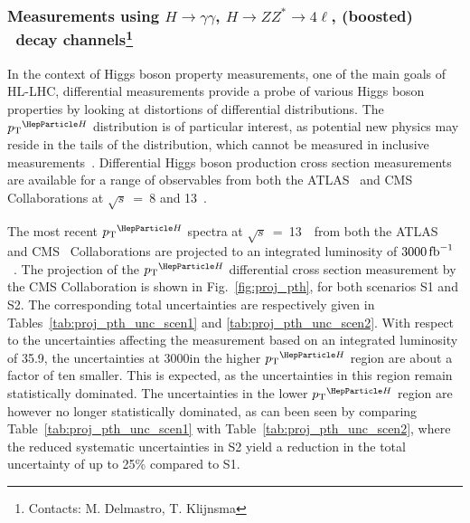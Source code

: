 \subsubsection[Measurements using $H \to \gamma\gamma$, $H \to ZZ^* \to 4\ell$, (boosted) \Hbb\ decay channels]{Measurements using $H \to \gamma\gamma$, $H \to ZZ^* \to 4\ell$, (boosted) \Hbb\ decay channels\footnote{Contacts: M. Delmastro, T. Klijnsma}}
\label{sec:diffxs}


\noindent In the context of Higgs boson property measurements, one of the main goals of HL-LHC, differential measurements provide a probe of various Higgs boson properties by looking at distortions of differential distributions.
% 
The $\pTH$ distribution is of particular interest, as potential new physics may reside in the tails of the distribution, which cannot be measured in inclusive measurements~\cite{%
Khachatryan:2016vau,%
Aad:2015zhl,%
CMS:2018lkl%
}.
% 
Differential Higgs boson production cross section measurements are available for a range of observables from both the ATLAS~\cite{%
Aad:2014lwa,%
Aad:2014tca,%
Aad:2016lvc,%
Aaboud:2018xdt,%
Aaboud:2017oem,%
Aaboud:2018ezd%
} and CMS~\cite{%
Khachatryan:2015rxa,%
Khachatryan:2015yvw,%
Khachatryan:2016vnn,%
Sirunyan:2018kta,%
Sirunyan:2017exp,
Sirunyan:2018sgc
} Collaborations at $\sqrt{s}$~=~8 and 13~\UTeV.

The most recent $\pTH$ spectra at $\sqrt{s}$~=~13~\UTeV\ from both the ATLAS~\cite{Aaboud:2018ezd} and CMS~\cite{Sirunyan:2018sgc} Collaborations are projected to an integrated luminosity of $3000\mbox{\ensuremath{\,\text{fb}^\text{$-$1}}}$~\cite{CMS-PAS-FTR-18-011, ATL-PHYS-PUB-2018-040}.
The projection of the $\pTH$ differential cross section measurement by the CMS Collaboration is shown in Fig.~\ref{fig:proj_pth}, for both scenarios S1 and S2. The corresponding total uncertainties are respectively given in Tables~\ref{tab:proj_pth_unc_scen1} and \ref{tab:proj_pth_unc_scen2}. With respect to the uncertainties affecting the measurement based on an integrated luminosity of 35.9\fbinv, the uncertainties at 3000\fbinv in the higher $\pTH$ region are about a factor of ten smaller. This is expected, as the uncertainties in this region remain statistically dominated.
The uncertainties in the lower $\pTH$ region are however no longer statistically dominated, as can been seen by comparing Table~\ref{tab:proj_pth_unc_scen1} with Table~\ref{tab:proj_pth_unc_scen2}, where the reduced systematic uncertainties in S2 yield a reduction in the total uncertainty of up to 25\% compared to S1.

